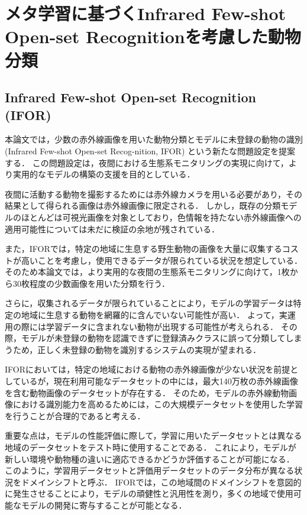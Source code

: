 \documentclass[a4paper,11pt,nomag]{jsreport}
\begin{document}
\setcounter{chapter}{3}

\chapter*{メタ学習に基づくInfrared Few-shot Open-set Recognitionを考慮した動物分類}

\section{Infrared Few-shot Open-set Recognition (IFOR)}

本論文では，少数の赤外線画像を用いた動物分類とモデルに未登録の動物の識別 (Infrared Few-shot Open-set Recog-nition, IFOR) という新たな問題設定を提案する．
この問題設定は，夜間における生態系モニタリングの実現に向けて，より実用的なモデルの構築の支援を目的としている．

夜間に活動する動物を撮影するためには赤外線カメラを用いる必要があり，その結果として得られる画像は赤外線画像に限定される．
しかし，既存の分類モデルのほとんどは可視光画像を対象としており，色情報を持たない赤外線画像への適用可能性については未だに検証の余地が残されている．

また，IFORでは，特定の地域に生息する野生動物の画像を大量に収集するコストが高いことを考慮し，使用できるデータが限られている状況を想定している．
そのため本論文では，より実用的な夜間の生態系モニタリングに向けて，1枚から30枚程度の少数画像を用いた分類を行う．

さらに，収集されるデータが限られていることにより，モデルの学習データは特定の地域に生息する動物を網羅的に含んでいない可能性が高い．
よって，実運用の際には学習データに含まれない動物が出現する可能性が考えられる．
その際，モデルが未登録の動物を認識できずに登録済みクラスに誤って分類してしまうため，正しく未登録の動物を識別するシステムの実現が望まれる．

IFORにおいては，特定の地域における動物の赤外線画像が少ない状況を前提としているが，現在利用可能なデータセットの中には，最大140万枚の赤外線画像を含む動物画像のデータセットが存在する．
そのため，モデルの赤外線動物画像における識別能力を高めるためには，この大規模データセットを使用した学習を行うことが合理的であると考える．

重要な点は，モデルの性能評価に際して，学習に用いたデータセットとは異なる地域のデータセットをテスト時に使用することである．
これにより，モデルが新しい環境や動物種の違いに適応できるかどうか評価することが可能になる．
このように，学習用データセットと評価用データセットのデータ分布が異なる状況をドメインシフトと呼ぶ．
IFORでは，この地域間のドメインシフトを意図的に発生させることにより，モデルの頑健性と汎用性を測り，多くの地域で使用可能なモデルの開発に寄与することが可能となる．
\end{document}
